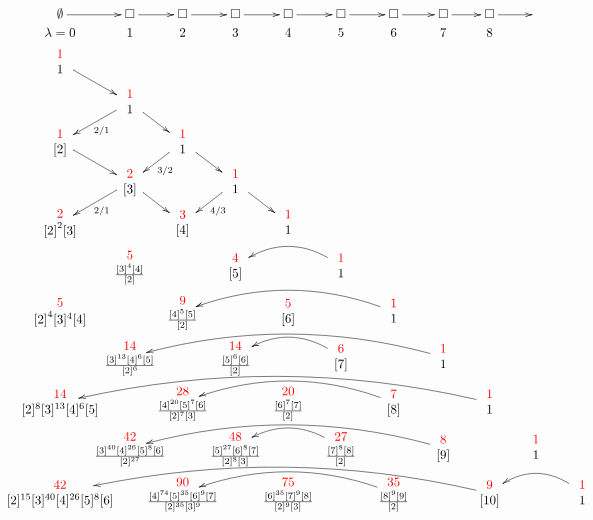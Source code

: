 %
\newcommand{\du}[2]{\begin{array}{c} \textcolor{red}{{#1}} \\ \hspace{-.321in}{#2}\hspace{-.321in} \end{array}}
\newcommand{\sqrr}{\square\ar[r]}
\newcommand{\goll}{\ar@/_1.3pc/[ll]} 
\newcommand{\gollll}{\ar@/_1.4pc/[llll]} 
\newcommand{\gollllll}{\ar@/_1.5pc/[llllll]} 
\newcommand{\gollllllll}{\ar@/_1.7pc/[llllllll]} 
%
%
\[ { } \hspace{-.73in} %
%
\xymatrix @C=15pt @R=1pt {
  {\emptyset}\ar[r] & \sqrr & \sqrr & \sqrr & \sqrr & \sqrr & \sqrr & \sqrr & \sqrr & { }
  \\
  {\lambda=0  }       &  1             &  2      &  3  &  4  &  5   & 6 & 7 & 8 
  \\  %
    {\du{1}{1} }\ar[dr]
    \\
& {\du{1}{1}}\ar[dr]\ar[dl]^{2/1}
\\ 
{\du{1}{{[2]}} }\ar[dr]    &                  &
{\du{1}{1}}\ar[dr]\ar[dl]^{3/2}
\\
&{\du{2}{[3]}} \ar[dr]\ar[dl]^{2/1}               &     &
{\du{1}{1}}\ar[dr]\ar[dl]^{4/3}
\\ 
{ \du{2}{{[ 2]}^2 [3]}}  &                     &
{\du{3}{[4]} }&    &
{\du{1}{1} }
\\
    & {\du{5}{{\frac{ [3]^4 [4]}{[2]}^{}}}} &  &
    {\du{4}{[5]}} &  &
    {\du{1}{1}}\ar@/_1.3pc/[ll]
    \\ 
    {\du{5}{{[2]}^4 [3]^4 [4]}} &              &
    {\du{9}{{\frac{[4]^5[5]}{[2]}^{}}}} &    &
    {\du{5}{[6]}} & &{ \du{1}{1}}\ar@/_1.4pc/[llll]
    \\ 
    &{\du{14}{\frac{[3]^{13}[4]^6[5]}{[2]^{6}}}} &&
    {\du{14}{\frac{[5]^6[6]}{[2]^{}}}} &&
    {\du{6}{[7]}}\ar@/_1.3pc/[ll] &&
    {\du{1}{1}}\gollllll
 \\
   {\du{14}{[2]^8[3]^{13}[4]^6[5]}}  &&
   {\du{28}{\frac{[4]^{20}[5]^7[6]}{[2]^{7}[3]^{}}}} &&
   {\du{20}{\frac{[6]^7[7]}{[2]^{}}}} &&
   {\du{7}{[8]}}\gollll  &&
   {\du{1}{1}}\gollllllll \\
   & {\du{42}{\frac{[3]^{40}[4]^{26}[5]^8[6]}{[2]^{27}}}} &&
   {\du{48}{\frac{[5]^{27}[6]^8[7]}{[2]^{8}[3]^{}}}} &&
   {\du{27}{\frac{[7]^8[8]}{[2]^{}}}}\goll &&
   {\du{8}{[9]}}\gollllll &&
   {\du{1}{1}}
 \\
   {\du{42}{[2]^{15}[3]^{40}[4]^{26}[5]^{8}[6]}} &&
   {\du{90}{\frac{[4]^{74}[5]^{35}[6]^{9}[7]}{[2]^{35}[3]^{9}}}} &&
   {\du{75}{
       \frac{  [6]^{35}[7]^{9}[8]}{[2]^{9}[3]^{}}}} &&
   {\du{35}{\frac{[8]^9[9]}{[2]^{}}}}\gollll &&
   {\du{9}{[10]}}\gollllllll &&
   {\du{1}{1}}\goll
}
\]

